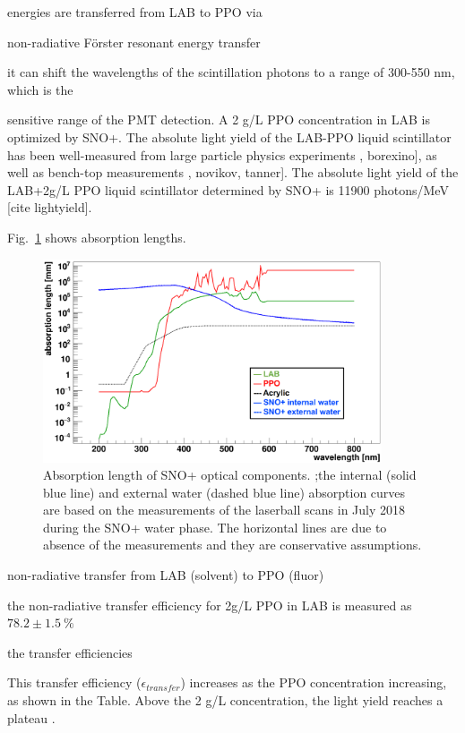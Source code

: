 energies are transferred from LAB to PPO via 


 non-radiative F{\"o}rster resonant energy transfer



it can shift the wavelengths of the scintillation photons to a range of 300-550 nm, which is the 

sensitive range of the PMT detection.  A 2 g/L PPO concentration in LAB is optimized by SNO+\cite{whitepaper}. The absolute light yield of the LAB-PPO liquid scintillator has been well-measured from large particle physics experiments \cite{xing2015preliminary}, borexino], as well as bench-top measurements \cite{xing2015preliminary}, novikov, tanner]. The absolute light yield of the LAB+2g/L PPO liquid scintillator determined by SNO+ is 11900 photons/MeV [cite lightyield].






Fig.~\ref{absLength} shows absorption lengths.

\begin{figure}[!htb]
	\centering
	\includegraphics[width=10cm]{absLength.png}
	\caption{Absorption length of SNO+ optical components. ;the internal (solid blue line) and external water (dashed blue line) absorption curves are based on the measurements of the laserball scans in July 2018 during the SNO+ water phase. The horizontal lines are due to absence of the measurements and they are conservative assumptions.}
	\label{absLength}
\end{figure}




non-radiative transfer from LAB (solvent) to PPO (fluor)


the non-radiative transfer efficiency for 2g/L PPO in LAB is measured as $78.2\pm 1.5~\%$

the transfer efficiencies


This transfer efficiency ($\mathcal{\epsilon}_{transfer}$) increases as the PPO concentration increasing, as shown in the Table. Above the 2 g/L concentration, the light yield reaches a plateau
\cite{scintillatorPaper}.

